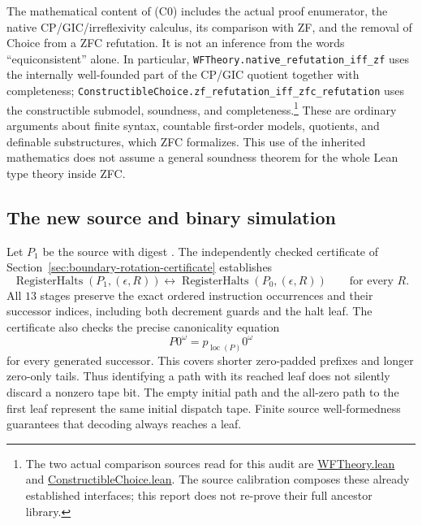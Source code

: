 The mathematical content of (C0) includes the actual proof enumerator,
the native CP/GIC/irreflexivity calculus, its comparison with ZF, and
the removal of Choice from a ZFC refutation.  It is not an inference from
the words ``equiconsistent'' alone.  In particular,
\texttt{WFTheory.native\_refutation\_iff\_zf} uses the internally
well-founded part of the CP/GIC quotient together with completeness;
\texttt{ConstructibleChoice.zf\_refutation\_iff\_zfc\_refutation}
uses the constructible submodel, soundness, and completeness.\footnote{The
two actual comparison sources read for this audit are
\href{https://github.com/VladimirReshetnikov/ProveIt/blob/13ec39ed43148b1807f51ed6e6528e1c84659562/Computability/BusyBeaver/Lean/BusyBeaver/ZFC/WFTheory.lean}{WFTheory.lean} and
\href{https://github.com/VladimirReshetnikov/ProveIt/blob/13ec39ed43148b1807f51ed6e6528e1c84659562/Computability/BusyBeaver/Lean/BusyBeaver/ZFC/ConstructibleChoice.lean}{ConstructibleChoice.lean}.
The source calibration composes these already established interfaces;
this report does not re-prove their full ancestor library.}
These are ordinary arguments about finite syntax, countable
first-order models, quotients, and definable substructures, which ZFC
formalizes.  This use of the inherited mathematics does not assume a
general soundness theorem for the whole Lean type theory inside ZFC.

\subsection{The new source and binary simulation}

Let $P_1$ be the source with digest
.
The independently checked certificate of
Section~\ref{sec:boundary-rotation-certificate} establishes
\[
 \operatorname{RegisterHalts}(P_1,(\epsilon,R))
 \longleftrightarrow
 \operatorname{RegisterHalts}(P_0,(\epsilon,R))
 \qquad\text{for every }R.
 \tag{S}
\]
All $13$ stages preserve the exact ordered instruction occurrences and
their successor indices, including both decrement guards and the halt
leaf.  The certificate also checks the precise canonicality equation
\[ P0^\omega=p_{\operatorname{loc}(P)}0^\omega \]
for every generated successor.  This covers shorter zero-padded prefixes
and longer zero-only tails.  Thus identifying a path with its reached leaf
does not silently discard a nonzero tape bit.  The empty initial path
and the all-zero path to the first leaf represent the same initial
dispatch tape.  Finite source well-formedness guarantees that decoding
always reaches a leaf.


